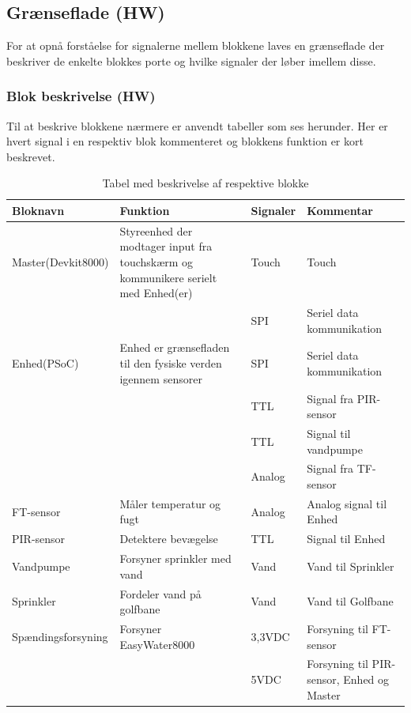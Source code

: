 \begin{table}[H] %
\subsection{Grænseflade (HW)}
For at opnå forståelse for signalerne mellem blokkene laves en grænseflade der beskriver de enkelte blokkes porte og hvilke signaler der løber imellem disse.

\subsubsection{Blok beskrivelse (HW)}
Til at beskrive blokkene nærmere er anvendt tabeller som ses herunder. Her er hvert signal i en respektiv blok kommenteret og blokkens funktion er kort beskrevet. 

\caption{Tabel med beskrivelse af respektive blokke}
\begin{small}
\begin{tabular}{|p{}|p{}|p{}|p{}|}
\hline
\textbf{Bloknavn} & \textbf{Funktion} & \textbf{Signaler} & \textbf{Kommentar} \\ \hline

Master(Devkit8000) & Styreenhed der modtager input fra touchskærm og kommunikere serielt med Enhed(er) & Touch & Touch \\ \cline{3-4}	
& 				   & SPI & Seriel data kommunikation \\ \hline

Enhed(PSoC) & Enhed er grænsefladen til den fysiske verden igennem sensorer & SPI & Seriel data kommunikation \\ \cline{3-4}
& & TTL 		& Signal fra PIR-sensor	\\ \cline{3-4}
& & TTL 		& Signal til vandpumpe 	\\ \cline{3-4}
& & Analog 	& Signal fra TF-sensor 	\\ \hline

FT-sensor & Måler temperatur og fugt & Analog & Analog signal til Enhed \\ \hline

PIR-sensor & Detektere bevægelse & TTL & Signal til Enhed \\ \hline

Vandpumpe & Forsyner sprinkler med vand & Vand & Vand til Sprinkler \\ \hline
 
Sprinkler & Fordeler vand på golfbane & Vand & Vand til Golfbane \\ \hline

Spændingsforsyning & Forsyner EasyWater8000 & 3,3VDC & Forsyning til FT-sensor \\ \cline{3-4}
& & 5VDC 		& Forsyning til PIR-sensor, Enhed og Master 	\\ \hline
\end{tabular}
\end{small}
\label{table:Bloktabel}
\end{table}

